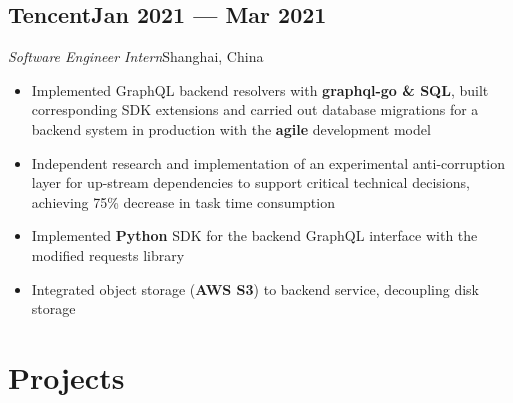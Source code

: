\documentclass[a4,12pt]{article}
\newcommand{\subtext}[1]{
#1\par\vspace{-0.3cm}}
\newenvironment{zitemize}{
\begin{itemize}\itemsep0pt \parskip0pt \parsep1pt}
{\end{itemize}\vspace{-0.5cm}}
\begin{document}
\subsection*{\normalsize\textbf{Tencent}\hfill Jan 2021 --- Mar 2021} 
\subtext{\textit{Software Engineer Intern}\hfill Shanghai, China} 
    \begin{zitemize}
        \item Implemented GraphQL backend resolvers with \textbf{graphql-go \& SQL}, built corresponding SDK extensions and carried out database migrations for a backend system in production with the \textbf{agile} development model
        \item Independent research and implementation of an experimental anti-corruption layer for up-stream dependencies to support critical technical decisions, achieving 75\% decrease in task time consumption
        \item Implemented \textbf{Python} SDK for the backend GraphQL interface with the modified requests library
        \item Integrated object storage (\textbf{AWS S3}) to backend service, decoupling disk storage
    \end{zitemize}






\vspace{-0.2cm}

\section{\textbf{Projects}}

\end{document}
